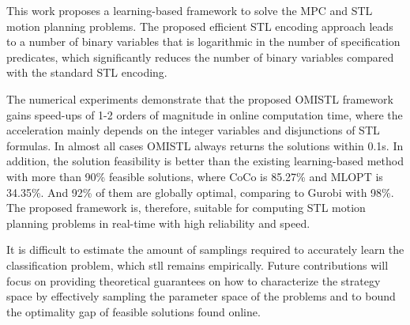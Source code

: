 \documentclass[a4paper]{report}
\begin{document}
This work proposes a learning-based framework to solve the MPC and STL motion planning problems. The proposed efficient STL encoding approach leads to a number of binary variables that is logarithmic in the number of specification predicates, which significantly reduces the number of binary variables compared with the standard STL encoding. 

The numerical experiments demonstrate that the proposed OMISTL framework gains speed-ups of 1-2 orders of magnitude in online computation time, where the acceleration mainly depends on the integer variables and disjunctions of STL formulas. In almost all cases OMISTL always returns the solutions within 0.1s. In addition, the solution feasibility is better than the existing learning-based method with more than 90\% feasible solutions, where CoCo is 85.27\% and MLOPT is 34.35\%. And 92\% of them are globally optimal, comparing to Gurobi with 98\%. The proposed framework is, therefore, suitable for computing STL motion planning problems in real-time with high reliability and speed.

It is difficult to estimate the amount of samplings required to accurately learn the classification problem, which stll remains empirically. Future contributions will focus on providing theoretical guarantees on how to characterize the strategy space by effectively sampling the parameter space of the problems and
to bound the optimality gap of feasible solutions found online.




\sloppy  %
\end{document}
